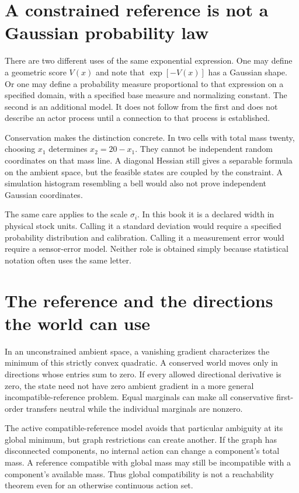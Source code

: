 \section{A constrained reference is not a Gaussian probability law}
There are two different uses of the same exponential expression. One may
define a geometric score $V(x)$ and note that $\exp[-V(x)]$ has a
Gaussian shape. Or one may define a probability measure proportional to
that expression on a specified domain, with a specified base measure and
normalizing constant. The second is an additional model. It does not follow
from the first and does not describe an actor process until a connection
to that process is established.

Conservation makes the distinction concrete. In two cells with total mass
twenty, choosing $x_1$ determines $x_2=20-x_1$. They cannot be independent
random coordinates on that mass line. A diagonal Hessian still gives a
separable formula on the ambient space, but the feasible states are
coupled by the constraint. A simulation histogram resembling a bell would
also not prove independent Gaussian coordinates.

The same care applies to the scale $\sigma_i$. In this book it is a
declared width in physical stock units. Calling it a standard deviation
would require a specified probability distribution and calibration. Calling
it a measurement error would require a sensor-error model. Neither role
is obtained simply because statistical notation often uses the same letter.

\section{The reference and the directions the world can use}
In an unconstrained ambient space, a vanishing gradient characterizes the
minimum of this strictly convex quadratic. A conserved world moves only
in directions whose entries sum to zero. If every allowed directional
derivative is zero, the state need not have zero ambient gradient in a
more general incompatible-reference problem. Equal marginals can make
all conservative first-order transfers neutral while the individual
marginals are nonzero.

The active compatible-reference model avoids that particular ambiguity at
its global minimum, but graph restrictions can create another. If the
graph has disconnected components, no internal action can change a
component's total mass. A reference compatible with global mass may still
be incompatible with a component's available mass. Thus global compatibility
is not a reachability theorem even for an otherwise continuous action set.

